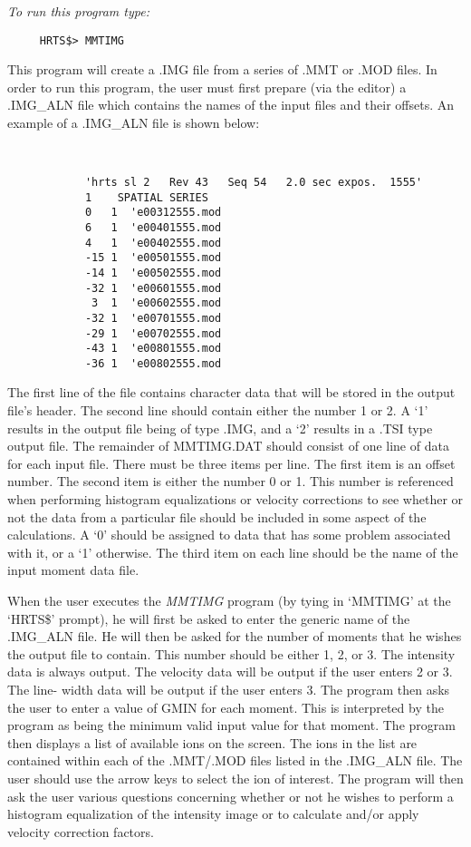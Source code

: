 {\em To run this program type:}
\begin{verbatim}
     HRTS$> MMTIMG
\end{verbatim}
      This program will create a .IMG file from a series of .MMT or .MOD
   files.  In order to run this program, the user must first prepare (via
   the editor) a .IMG\_ALN file which contains the names of the input files
   and their offsets.  An example of a .IMG\_ALN file is shown below:
\begin{verbatim}


            'hrts sl 2   Rev 43   Seq 54   2.0 sec expos.  1555'
            1    SPATIAL SERIES
            0   1  'e00312555.mod
            6   1  'e00401555.mod
            4   1  'e00402555.mod
            -15 1  'e00501555.mod
            -14 1  'e00502555.mod
            -32 1  'e00601555.mod
             3  1  'e00602555.mod
            -32 1  'e00701555.mod
            -29 1  'e00702555.mod
            -43 1  'e00801555.mod
            -36 1  'e00802555.mod

\end{verbatim}
      The first line of the file contains character data that will be
   stored in the output file's header.  The second line should contain
   either the number 1 or 2.  A `1' results in the output file being of
   type .IMG, and a `2' results in a .TSI type output file.  The remainder
   of MMTIMG.DAT should consist of one line of data for each input file.
   There must be three items per line.  The first item is an offset
   number.
   The second item is either the number 0 or 1.  This number is
   referenced when performing histogram equalizations or velocity
   corrections to see whether or not the data from a particular file
   should be included in some aspect of the calculations.  A `0' should be
   assigned to data that has some problem associated with it, or a `1'
   otherwise.  The third item on each line should be the name of the input
   moment data file.

      When the user executes the {\em MMTIMG} program (by tying in `MMTIMG' at
   the `HRTS\$' prompt), he will first be asked to enter the generic name of
   the .IMG\_ALN file.  He will then be asked for the number of moments
   that he wishes the output file to contain.  This number should be
   either 1, 2, or 3.  The intensity data is always output.  The
   velocity data will be output if the user enters 2 or 3.  The line-
   width data will be output if the user enters 3.
      The program then asks the user to enter a value of GMIN for each
   moment.  This is interpreted by the program as being the minimum valid
   input value for that moment.
      The program then displays a list of available ions on the screen.
   The ions in the list are contained within each of the .MMT/.MOD files
   listed in the .IMG\_ALN file.  The user should use the arrow keys to
   select the ion of interest.
      The program will then ask the user various questions concerning
   whether or not he wishes to perform a histogram equalization of the
   intensity image or to calculate and/or apply velocity correction
   factors.


